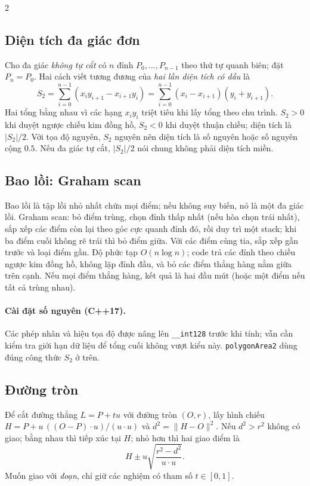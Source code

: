 \begin{multicols}{2}
\subsection{Diện tích đa giác đơn}
Cho đa giác \emph{không tự cắt} có $n$ đỉnh $P_0,\ldots,P_{n-1}$
theo thứ tự quanh biên; đặt $P_n=P_0$. Hai cách viết tương đương của
\emph{hai lần diện tích có dấu} là
\[
S_2=\sum_{i=0}^{n-1}(x_i y_{i+1}-x_{i+1}y_i)
=\sum_{i=0}^{n-1}(x_i-x_{i+1})(y_i+y_{i+1}).
\]
Hai tổng bằng nhau vì các hạng $x_i y_i$ triệt tiêu khi lấy tổng
theo chu trình. $S_2>0$ khi duyệt ngược chiều kim đồng hồ, $S_2<0$
khi duyệt thuận chiều; diện tích là $|S_2|/2$. Với tọa độ nguyên,
$S_2$ nguyên nên diện tích là số nguyên hoặc số nguyên cộng $0.5$.
Nếu đa giác tự cắt, $|S_2|/2$ nói chung không phải diện tích miền.

\subsection{Bao lồi: Graham scan}
Bao lồi là tập lồi nhỏ nhất chứa mọi điểm; nếu không suy biến,
nó là một đa giác lồi. Graham scan: bỏ điểm
trùng, chọn đỉnh thấp nhất (nếu hòa chọn trái nhất), sắp xếp các
điểm còn lại theo góc cực quanh đỉnh đó, rồi duy trì một stack;
khi ba điểm cuối không rẽ trái thì bỏ điểm giữa. Với các điểm cùng
tia, sắp xếp gần trước và loại điểm gần. Độ phức tạp $O(n\log n)$;
code trả các đỉnh theo chiều ngược kim đồng hồ, không lặp đỉnh đầu,
và bỏ các điểm thẳng hàng nằm giữa trên cạnh. Nếu mọi điểm thẳng
hàng, kết quả là hai đầu mút (hoặc một điểm nếu tất cả trùng nhau).

\paragraph{Cài đặt số nguyên (C++17).}
Các phép nhân và hiệu tọa độ được nâng lên \texttt{\_\_int128}
trước khi tính; vẫn cần kiểm tra giới hạn dữ liệu để tổng cuối không
vượt kiểu này. \texttt{polygonArea2} dùng đúng công thức $S_2$ ở trên.

\subsection{Đường tròn}
Để cắt đường thẳng $L=P+tu$ với đường tròn $(O,r)$, lấy hình chiếu
$H=P+u\,((O-P)\cdot u)/(u\cdot u)$ và $d^2=\lVert H-O\rVert^2$.
Nếu $d^2>r^2$ không có giao; bằng nhau thì tiếp xúc tại $H$;
nhỏ hơn thì hai giao điểm là
\[
H\pm u\sqrt{\frac{r^2-d^2}{u\cdot u}}.
\]
Muốn giao với \emph{đoạn}, chỉ giữ các nghiệm có tham số $t\in[0,1]$.


\end{multicols}
